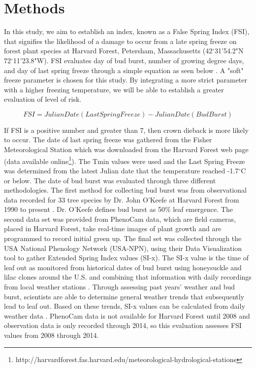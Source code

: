 \documentclass{article}\usepackage[]{graphicx}\usepackage[]{color}
\begin{document}
\section{Methods}

In this study, we aim to establish an index, known as a False Spring Index (FSI), that signifies the likelihood of a damage to occur from a late spring freeze on forest plant species at Harvard Forest, Petersham, Massachusetts (42$^{\circ}$31'54.2"N 72$^{\circ}$11'23.8"W). FSI evaluates day of bud burst, number of growing degree days, and day of last spring freeze through a simple equation as seen below \cite{Marino2011}. A "soft" freeze parameter is chosen for this study. By integrating a more strict parameter with a higher freezing temperature, we will be able to establish a greater evaluation of level of risk. 

\[ FSI = Julian Date (Last Spring Freeze) - Julian Date (Bud Burst) \]

If FSI is a positive number and greater than 7, then crown dieback is more likely to occur. The date of last spring freeze was gathered from the Fisher Meteorological Station which was downloaded from the Harvard Forest web page (data available online\footnote{http://harvardforest.fas.harvard.edu/meteorological-hydrological-stations}). The Tmin values were used and the Last Spring Freeze was  determined from the latest Julian date that the temperature reached -1.7$^{\circ}$C or below. The date of bud burst was evaluated through three different methodologies. The first method for collecting bud burst was from observational data recorded for 33 tree species by Dr. John O'Keefe at Harvard Forest from 1990 to present \cite{OKeefe2014}. Dr. O'Keefe defines bud burst as 50\% leaf emergence. The second data set was provided from PhenoCam data, which are field cameras, placed in Harvard Forest, take real-time images of plant growth and are programmed to record initial green up. The final set was collected through the USA National Phenology Network (USA-NPN), using their Data Visualization tool to gather Extended Spring Index values (SI-x). The SI-x value is the time of leaf out as monitored from historical dates of bud burst using honeysuckle and lilac clones around the U.S. and combining that information with daily recordings from local weather stations \cite{USA-NPN2016, Ault2015, Ault2015a, Schwartz2013, Schwartz1997}. Through assessing past years' weather and bud burst, scientists are able to determine general weather trends that subsequently lead to leaf out. Based on these trends, SI-x values can be calculated from daily weather data \cite{USA-NPN2016}. %
\newline
PhenoCam data is not available for Harvard Forest until 2008 and observation data is only recorded through 2014, so this evaluation assesses FSI values from 2008 through 2014. 
\end{document}
